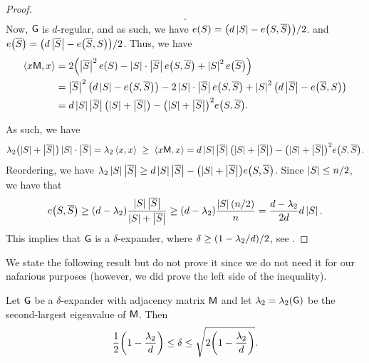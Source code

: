 {\begin{proof}
\begin{align*}
{        }.
    \end{align*}
    Now, $\mathsf{G}$ is $d$-regular, and as such, we have $e(S) = \pth{d
       \cardin{S} - e\pth{S, \overline{S}}}/2$.  and
    $e\pth{\overline{S}} = \pth{d \cardin{\overline{S}} -
       e\pth{\overline{S}, S}}/2$. Thus, we have
    \begin{align*}
        \DotProd{ x \Mtrx}{x} %
        &=%
        2 \pth{ \cardin{\overline{S}}^2 e(S) - \cardin{S} \cdot
           \cardin{\overline{S}} e\pth{S,\overline{S} }
           + \cardin{S}^2  e \pth{\overline{S}}}\\
        &=%
        \cardin{\overline{S}}^2 \pth{d \cardin{S} - e\pth{S,
              \overline{S}}} - 2 \cardin{S} \cdot
        \cardin{\overline{S}} e\pth{S,\overline{S} } + \cardin{S}^2
        \pth{d \cardin{\overline{S}} -
           e\pth{\overline{S}, S}}\\
        &= d \cardin{S} \cardin{\overline{S}} \pth{ \cardin{S} +
           \cardin{\overline{S}}} - \pth[]{ \cardin{S} +
           \cardin{\overline{S}}}^2 
        e\pth{S, \overline{S}}.
    \end{align*}


    As such, we have
   \[
   \lambda_2 \pth{ \cardin{S} + \cardin{\overline{S}}} \cardin{S}
   \cdot \cardin{\overline{S}} = \lambda_2 \DotProd{x}{x} \; \geq \;
   \DotProd{x \Mtrx}{x} = d \cardin{S} \cardin{\overline{S}} \pth{
      \cardin{S} + \cardin{\overline{S}}} - \pth[]{ \cardin{S} +
      \cardin{\overline{S}}}^2 e\pth{S, \overline{S}}.
   \]
   Reordering, we have $\displaystyle \lambda_2 \cardin{S}
   \cardin{\overline{S}} \geq d \cardin{S} \cardin{\overline{S}} -
   \pth[]{ \cardin{S} + \cardin{\overline{S}}} e\pth{S,
      \overline{S}}$. Since $\left| {S} \right| \leq n/2$, we have that
   \[
   e\pth{S, \overline{S}} \geq \pth{d -\lambda_2} \frac{\cardin{S}
      \cardin{\overline{S}}}{ \cardin{S} + \cardin{\overline{S}}} \geq
   \pth{d -\lambda_2} \frac{\cardin{S}(n/2)}{n}
   = \frac{d -\lambda_2}{2d} d \cardin{S}.
   \]
   This implies that $\mathsf{G}$ is a $\delta$-expander, where 
   $\delta \geq  \pth{1 -\lambda_2/d}/2$, see 
   .    
\end{proof}
}

We state the following result but do not prove it since we do not need
it for our nafarious purposes (however, we did prove the left side of
the inequality).
\begin{theorem}
    Let $\mathsf{G}$ be a $\delta$-expander with adjacency matrix $\mathsf{M}$
    and let $\lambda_2 = \lambda_2(\mathsf{G})$ be the second-largest
    eigenvalue of $\mathsf{M}$. Then 
    \[
    \frac{1}{2} \pth{1- \frac{\lambda_2}{d}} \leq \delta\leq
    \sqrt{2\pth{1 - \frac{\lambda_2}{d}}}.
    \]
\end{theorem}

